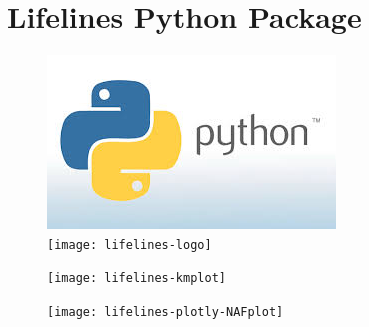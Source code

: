 \documentclass[]{beamer}
\begin{document}
	\section{Lifelines Python Package}
	\begin{frame}
		\begin{figure}
			\centering
			\includegraphics[width=0.7\linewidth]{pythonlogo}\\
			\smallskip
			\texttt{[image: lifelines-logo]}
			
		\end{figure}
		
	\end{frame}
	\begin{frame}
		\begin{figure}
			\centering
			\texttt{[image: lifelines-kmplot]}
			\caption{}
			\label{fig:lifelines-kmplot}
		\end{figure}
		
	\end{frame}
	
	\begin{frame}
		\begin{figure}
			\centering
			\texttt{[image: lifelines-plotly-NAFplot]}
			\caption{}
			\label{fig:lifelines-plotly-NAFplot}
		\end{figure}
		
	\end{frame}
\end{document}
